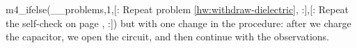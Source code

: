m4_ifelse(__problems,1,[:%
Repeat problem \ref{hw:withdraw-dielectric},
:],[:%
Repeat the self-check on page \pageref{sc:withdraw-dielectric},
:])%
but
with one change in the procedure: after we charge the capacitor, we
open the circuit, and then continue with the observations. 
